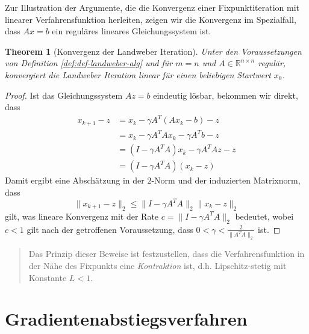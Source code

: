 \documentclass[
]{book}
\newenvironment {JHSAYS} [0] {\begin{quote}\color{jhsc}} {\end{quote}}
\newtheorem{theorem}{Theorem}[chapter]
\theoremstyle{definition}
\theoremstyle{definition}
\theoremstyle{definition}
\theoremstyle{definition}
\theoremstyle{remark}
\begin{document}
Zur Illustration der Argumente, die die Konvergenz einer Fixpunktiteration mit linearer Verfahrensfunktion herleiten, zeigen wir die Konvergenz im Spezialfall, dass \(Ax=b\) ein reguläres lineares Gleichungssystem ist.

\begin{theorem}[Konvergenz der Landweber Iteration]
\protect\hypertarget{thm:thm-lw-conv}{}\label{thm:thm-lw-conv}Unter den Voraussetzungen von Definition \ref{def:def-landweber-alg} und für \(m=n\) und \(A\in \mathbb R^{n\times n}\) regulär, konvergiert die Landweber Iteration linear für einen beliebigen Startwert \(x_0\).
\end{theorem}

\begin{proof}
Ist das Gleichungssystem \(Az=b\) eindeutig lösbar, bekommen wir direkt, dass
\begin{equation*}
\begin{split}
x_{k+1} - z &= x_k - \gamma A^T(Ax_k -b ) - z  \\
&= x_k - \gamma A^TAx_k -\gamma A^Tb - z \\
&= (I-\gamma A^TA)x_k -\gamma A^TAz - z \\
&= (I-\gamma A^TA)(x_k - z)
\end{split}
\end{equation*}
Damit ergibt eine Abschätzung in der \(2\)-Norm und der induzierten Matrixnorm, dass
\begin{equation*}
\|x_{k+1}-z\|_2 \leq \|I-\gamma A^TA\|_2\|x_k-z\|_2
\end{equation*}
gilt, was lineare Konvergenz mit der Rate \(c=\|I-\gamma A^TA\|_2\) bedeutet, wobei \(c<1\) gilt nach der getroffenen Voraussetzung, dass \(0<\gamma<\frac{2}{\|A^TA\|_2}\) ist.
\end{proof}

\leavevmode\hypertarget{rem-fpconv-iteration-contraction}{}%
\begin{JHSAYS}
Das Prinzip dieser Beweise ist festzustellen, dass die Verfahrensfunktion in der Nähe des Fixpunkts eine \emph{Kontraktion} ist, d.h. Lipschitz-stetig mit Konstante \(L<1\).

\end{JHSAYS}

\hypertarget{gradientenabstiegsverfahren}{%
\section{Gradientenabstiegsverfahren}\label{gradientenabstiegsverfahren}}
\end{document}
